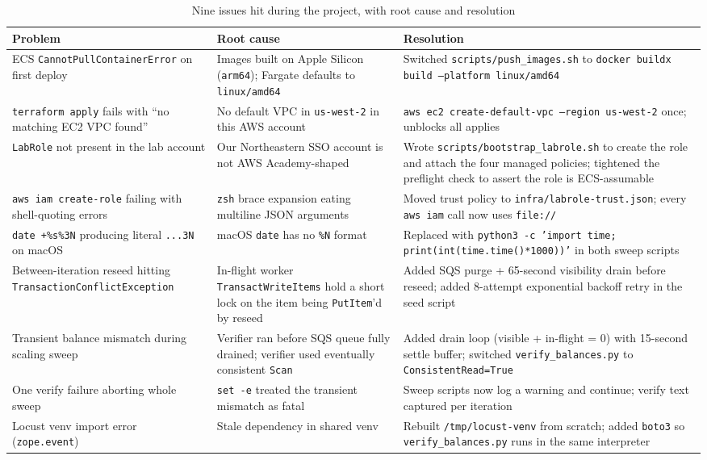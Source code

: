\documentclass[11pt,a4paper]{article}
\begin{document}
\begin{table}[h]
\centering
\small
\renewcommand{\arraystretch}{1.2}
\caption{Nine issues hit during the project, with root cause and resolution}
\label{tab:issues}
\begin{tabular}{>{\raggedright\arraybackslash}p{3.7cm} >{\raggedright\arraybackslash}p{5.2cm} >{\raggedright\arraybackslash}p{5.5cm}}
\toprule
\rowcolor{boxblue}
\textbf{Problem} & \textbf{Root cause} & \textbf{Resolution} \\
\midrule
ECS \texttt{CannotPullContainerError} on first deploy & Images built on Apple Silicon (\texttt{arm64}); Fargate defaults to \texttt{linux/amd64} & Switched \texttt{scripts/push\_images.sh} to \texttt{docker buildx build --platform linux/amd64} \\
\texttt{terraform apply} fails with ``no matching EC2 VPC found'' & No default VPC in \texttt{us-west-2} in this AWS account & \texttt{aws ec2 create-default-vpc --region us-west-2} once; unblocks all applies \\
\texttt{LabRole} not present in the lab account & Our Northeastern SSO account is not AWS Academy-shaped & Wrote \texttt{scripts/bootstrap\_labrole.sh} to create the role and attach the four managed policies; tightened the preflight check to assert the role is ECS-assumable \\
\texttt{aws iam create-role} failing with shell-quoting errors & \texttt{zsh} brace expansion eating multiline JSON arguments & Moved trust policy to \texttt{infra/labrole-trust.json}; every \texttt{aws iam} call now uses \texttt{file://} \\
\texttt{date +\%s\%3N} producing literal \texttt{...3N} on macOS & macOS \texttt{date} has no \texttt{\%N} format & Replaced with \texttt{python3 -c 'import time; print(int(time.time()*1000))'} in both sweep scripts \\
Between-iteration reseed hitting \texttt{TransactionConflictException} & In-flight worker \texttt{TransactWriteItems} hold a short lock on the item being \texttt{PutItem}'d by reseed & Added SQS purge + 65-second visibility drain before reseed; added 8-attempt exponential backoff retry in the seed script \\
Transient balance mismatch during scaling sweep & Verifier ran before SQS queue fully drained; verifier used eventually consistent \texttt{Scan} & Added drain loop (visible + in-flight = 0) with 15-second settle buffer; switched \texttt{verify\_balances.py} to \texttt{ConsistentRead=True} \\
One verify failure aborting whole sweep & \texttt{set -e} treated the transient mismatch as fatal & Sweep scripts now log a warning and continue; verify text captured per iteration \\
Locust venv import error (\texttt{zope.event}) & Stale dependency in shared venv & Rebuilt \texttt{/tmp/locust-venv} from scratch; added \texttt{boto3} so \texttt{verify\_balances.py} runs in the same interpreter \\
\bottomrule
\end{tabular}
\end{table}
\end{document}
